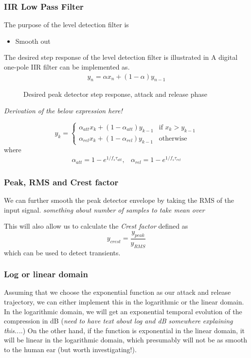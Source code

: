 \subsubsection{IIR Low Pass Filter}
The purpose of the level detection filter is 
\begin{itemize}
\item{Smooth out}
\end{itemize}
The desired step response of the level detection filter is illustrated in  A digital one-pole IIR filter can be implemented as\cite{giannoulis}.
\begin{align}
y_n = \alpha x_{n} + (1-\alpha)y_{n-1}
\end{align}
\begin{figure}[ht]
\centering

\caption{Desired peak detector step response, attack and release phase} 
\label{fig:attack-release-graph}
\end{figure}
\emph{Derivation of the below expression here!}

\begin{equation}
y_k = \left\{
  \begin{array}{ll}
    \alpha_{att} x_k + (1-\alpha_{att})y_{k-1} & \text{if }  x_k > y_{k-1} \\
    \alpha_{rel} x_k + (1-\alpha_{rel})y_{k-1} & \text{otherwise} 
  \end{array}
\right.
\end{equation}
where
\begin{equation}
\begin{array}{lr}
\alpha_{att} = 1-e^{1/f_s \tau_{att}}, & \alpha_{rel} = 1-e^{1/f_s \tau_{rel}}
\end{array}
\end{equation}
\subsubsection{Peak, RMS and Crest factor}
We can further smooth the peak detector envelope by taking the RMS of the input signal. \emph{something about number of samples to take mean over}

This will also allow us to calculate the \emph{Crest factor} defined as
\begin{equation}
y_{crest} = \frac{y_{peak}}{y_{RMS}}
\end{equation}
which can be used to detect transients.

\subsubsection{Log or linear domain}
Assuming that we choose the exponential function as our attack and release trajectory, we can either implement this in the logarithmic or the linear domain. In the logarithmic domain, we will get an exponential temporal evolution of the compression in dB (\emph{need to have text about log and dB somewhere explaining this...}.) On the other hand, if the function is exponential in the linear domain, it will be linear in the logarithmic domain, which presumably will not be as smooth to the human ear (but worth investigating!).

